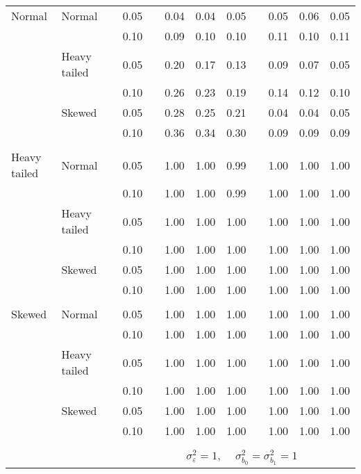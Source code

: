 \begin{table}[ht]
\begin{scriptsize}
\begin{center}
\begin{tabular}{ll p{.1cm} c p{.1cm} rrr p{.1cm} rrr}
\rowcolor{gray!20}Normal       & Normal       && 0.05 &&  0.04 & 0.04 & 0.05 && 0.05 & 0.06 & 0.05 \\ 
\rowcolor{gray!20}             &              && 0.10 &&  0.09 & 0.10 & 0.10 && 0.11 & 0.10 & 0.11 \\ 
\rowcolor{gray!20}             & Heavy tailed && 0.05 &&  0.20 & 0.17 & 0.13 && 0.09 & 0.07 & 0.05 \\ 
\rowcolor{gray!20}             &              && 0.10 &&  0.26 & 0.23 & 0.19 && 0.14 & 0.12 & 0.10 \\ 
\rowcolor{gray!20}             & Skewed       && 0.05 &&  0.28 & 0.25 & 0.21 && 0.04 & 0.04 & 0.05 \\ 
\rowcolor{gray!20}             &              && 0.10 &&  0.36 & 0.34 & 0.30 && 0.09 & 0.09 & 0.09 \\ 
             &&&&&&&&&&&\\
Heavy tailed & Normal       && 0.05 &&  1.00 & 1.00 & 0.99 && 1.00 & 1.00 & 1.00 \\ 
             &              && 0.10 &&  1.00 & 1.00 & 0.99 && 1.00 & 1.00 & 1.00 \\ 
             & Heavy tailed && 0.05 &&  1.00 & 1.00 & 1.00 && 1.00 & 1.00 & 1.00 \\ 
             &              && 0.10 &&  1.00 & 1.00 & 1.00 && 1.00 & 1.00 & 1.00 \\ 
             & Skewed       && 0.05 &&  1.00 & 1.00 & 1.00 && 1.00 & 1.00 & 1.00 \\ 
             &              && 0.10 &&  1.00 & 1.00 & 1.00 && 1.00 & 1.00 & 1.00 \\ 
             &&&&&&&&&&&\\
Skewed       & Normal       && 0.05 &&  1.00 & 1.00 & 1.00 && 1.00 & 1.00 & 1.00 \\ 
             &              && 0.10 &&  1.00 & 1.00 & 1.00 && 1.00 & 1.00 & 1.00 \\ 
             & Heavy tailed && 0.05 &&  1.00 & 1.00 & 1.00 && 1.00 & 1.00 & 1.00 \\ 
             &              && 0.10 &&  1.00 & 1.00 & 1.00 && 1.00 & 1.00 & 1.00 \\ 
             & Skewed       && 0.05 &&  1.00 & 1.00 & 1.00 && 1.00 & 1.00 & 1.00 \\ 
             &              && 0.10 &&  1.00 & 1.00 & 1.00 && 1.00 & 1.00 & 1.00 \\ 

&&&&&&&&&&&\\
& && && \multicolumn{6}{c}{$\sigma_{\varepsilon}^2 = 1$, \ \ $\sigma_{b_0}^2 = \sigma_{b_1}^2 = 1$} \\ \cline{6-12}


\end{tabular}
\end{center}
\end{scriptsize}
\end{table}
